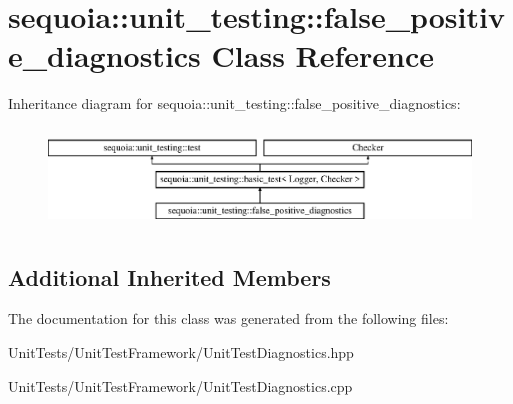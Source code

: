 \hypertarget{classsequoia_1_1unit__testing_1_1false__positive__diagnostics}{}\section{sequoia\+::unit\+\_\+testing\+::false\+\_\+positive\+\_\+diagnostics Class Reference}
\label{classsequoia_1_1unit__testing_1_1false__positive__diagnostics}
Inheritance diagram for sequoia\+::unit\+\_\+testing\+::false\+\_\+positive\+\_\+diagnostics\+:\begin{figure}[H]
\begin{center}
\leavevmode
\includegraphics[height=2.666667cm]{classsequoia_1_1unit__testing_1_1false__positive__diagnostics}
\end{center}
\end{figure}
\subsection*{Additional Inherited Members}


The documentation for this class was generated from the following files\+:\begin{DoxyCompactItemize}
\item 
Unit\+Tests/\+Unit\+Test\+Framework/Unit\+Test\+Diagnostics.\+hpp\item 
Unit\+Tests/\+Unit\+Test\+Framework/Unit\+Test\+Diagnostics.\+cpp\end{DoxyCompactItemize}
